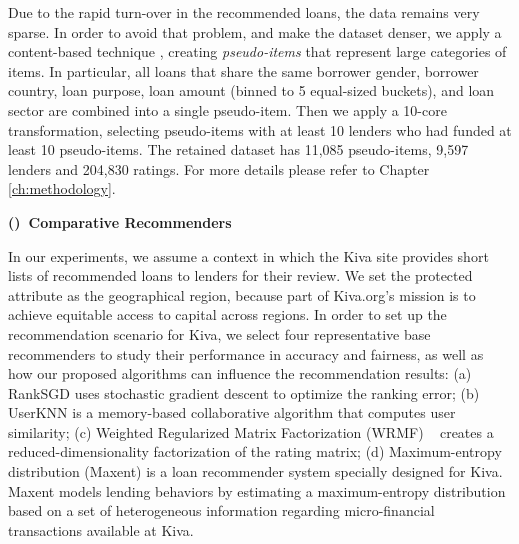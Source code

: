 Due to the rapid turn-over in the recommended loans, the data remains very sparse. In order to avoid that problem, and make the dataset denser, we apply a content-based technique \cite{resnick1997recommender}, creating \textit{pseudo-items} that represent large categories of items. In particular, all loans that share the same borrower gender, borrower country, loan purpose, loan amount (binned to 5 equal-sized buckets), and loan sector are combined into a single pseudo-item. Then we apply a 10-core transformation, selecting pseudo-items with at least 10 lenders who had funded at least 10 pseudo-items. The retained dataset has 11,085 pseudo-items, 9,597 lenders and 204,830 ratings. For more details please refer to Chapter \ref{ch:methodology}.

\vspace{0.25cm}
\noindent \textbf{()~Comparative Recommenders}
\vspace{0.25cm}

In our experiments, we assume a context in which the Kiva site provides short lists of recommended loans to lenders for their review. We set the protected attribute as the geographical region, because part of Kiva.org's mission is to achieve equitable access to capital across regions. In order to set up the recommendation scenario for Kiva, we select four representative base recommenders to study their performance in accuracy and fairness, as well as how our proposed algorithms can influence the recommendation results: (a) RankSGD \cite{pmlr-v18-jahrer12b} uses stochastic gradient descent to optimize the ranking error; (b) UserKNN \cite{resnick1997recommender} is a memory-based collaborative algorithm that computes user similarity; (c) Weighted Regularized Matrix Factorization (WRMF) ~\cite{hu2008collaborative} creates a reduced-dimensionality factorization of the rating matrix; (d) Maximum-entropy distribution (Maxent) \cite{choo2014gather} is a loan recommender system specially designed for Kiva. Maxent models lending behaviors by estimating a maximum-entropy distribution based on a set of heterogeneous information regarding micro-financial transactions available at Kiva.


